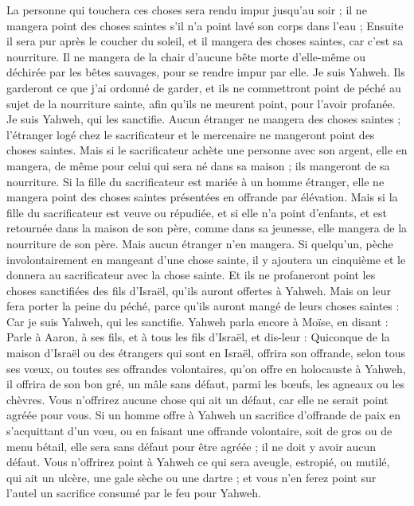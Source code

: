 \begin{multicols}{2}
La personne qui touchera ces choses sera rendu impur jusqu'au soir ; il ne mangera point des choses saintes s'il n'a point lavé son corps dans l'eau ;
Ensuite il sera pur après le coucher du soleil, et il mangera des choses saintes, car c'est sa nourriture.
Il ne mangera de la chair d'aucune bête morte d'elle-même ou déchirée  par les bêtes sauvages, pour se rendre impur par elle. Je suis Yahweh.
Ils garderont ce que j'ai ordonné de garder, et ils ne commettront point de péché au sujet de la nourriture sainte, afin qu'ils ne meurent point, pour l'avoir profanée. Je suis Yahweh, qui les sanctifie.
Aucun étranger ne mangera des choses saintes ; l'étranger logé chez le sacrificateur et le mercenaire ne mangeront point des choses saintes.
Mais si le sacrificateur achète une personne avec son argent, elle en mangera, de même pour celui qui sera né dans sa maison ; ils mangeront de sa nourriture.
Si la fille du sacrificateur est mariée à un homme étranger, elle ne mangera point des choses saintes présentées en offrande par élévation.
Mais si la fille du sacrificateur est veuve ou répudiée, et si elle n'a point d'enfants, et est retournée dans la maison de son père, comme dans sa jeunesse, elle mangera de la nourriture de son père. Mais aucun étranger n'en mangera.
Si quelqu'un, pèche involontairement en mangeant d'une chose sainte, il y ajoutera un cinquième et le donnera au sacrificateur avec la chose sainte.
Et ils ne profaneront point les choses sanctifiées des fils d'Israël, qu'ils auront offertes à Yahweh.
Mais on leur fera porter la peine du péché, parce qu'ils auront mangé de leurs choses saintes : Car je suis Yahweh, qui les sanctifie.
Yahweh parla encore à Moïse, en disant :
Parle à Aaron, à ses fils, et à tous les fils d'Israël, et dis-leur : Quiconque de la maison d'Israël ou des étrangers qui sont en Israël, offrira son offrande, selon tous ses vœux, ou toutes ses offrandes volontaires, qu'on offre en holocauste à Yahweh,
il offrira de son bon gré, un mâle sans défaut, parmi les bœufs, les agneaux ou les chèvres.
Vous n'offrirez aucune chose qui ait un défaut, car elle ne serait point agréée pour vous.
Si un homme offre à Yahweh un sacrifice d'offrande de paix en s'acquittant d'un vœu, ou en faisant une offrande volontaire, soit de gros ou de menu bétail, elle sera sans défaut pour être agréée ; il ne doit y avoir aucun défaut.
Vous n'offrirez point à Yahweh ce qui sera aveugle, estropié, ou mutilé, qui ait un ulcère, une gale sèche ou une dartre ; et vous n'en ferez point sur l'autel un sacrifice consumé par le feu pour Yahweh.

\end{multicols}
